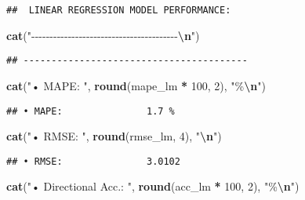 \documentclass[
]{article}
\newenvironment{Shaded}{\begin{snugshade}}{\end{snugshade}}
\newcommand{\DecValTok}[1]{\textcolor[rgb]{0.00,0.00,0.81}{#1}}
\newcommand{\FunctionTok}[1]{\textcolor[rgb]{0.13,0.29,0.53}{\textbf{#1}}}
\newcommand{\NormalTok}[1]{#1}
\newcommand{\SpecialCharTok}[1]{\textcolor[rgb]{0.81,0.36,0.00}{\textbf{#1}}}
\newcommand{\StringTok}[1]{\textcolor[rgb]{0.31,0.60,0.02}{#1}}
\begin{document}
\begin{verbatim}
##  LINEAR REGRESSION MODEL PERFORMANCE:
\end{verbatim}

\begin{Shaded}
\begin{Highlighting}[]
\FunctionTok{cat}\NormalTok{(}\StringTok{"{-}{-}{-}{-}{-}{-}{-}{-}{-}{-}{-}{-}{-}{-}{-}{-}{-}{-}{-}{-}{-}{-}{-}{-}{-}{-}{-}{-}{-}{-}{-}{-}{-}{-}{-}{-}{-}{-}{-}{-}}\SpecialCharTok{\textbackslash{}n}\StringTok{"}\NormalTok{)}
\end{Highlighting}
\end{Shaded}

\begin{verbatim}
## ----------------------------------------
\end{verbatim}

\begin{Shaded}
\begin{Highlighting}[]
\FunctionTok{cat}\NormalTok{(}\StringTok{"• MAPE:              "}\NormalTok{, }\FunctionTok{round}\NormalTok{(mape\_lm }\SpecialCharTok{*} \DecValTok{100}\NormalTok{, }\DecValTok{2}\NormalTok{), }\StringTok{"\%}\SpecialCharTok{\textbackslash{}n}\StringTok{"}\NormalTok{)}
\end{Highlighting}
\end{Shaded}

\begin{verbatim}
## • MAPE:               1.7 %
\end{verbatim}

\begin{Shaded}
\begin{Highlighting}[]
\FunctionTok{cat}\NormalTok{(}\StringTok{"• RMSE:              "}\NormalTok{, }\FunctionTok{round}\NormalTok{(rmse\_lm, }\DecValTok{4}\NormalTok{), }\StringTok{"}\SpecialCharTok{\textbackslash{}n}\StringTok{"}\NormalTok{)}
\end{Highlighting}
\end{Shaded}

\begin{verbatim}
## • RMSE:               3.0102
\end{verbatim}

\begin{Shaded}
\begin{Highlighting}[]
\FunctionTok{cat}\NormalTok{(}\StringTok{"• Directional Acc.:  "}\NormalTok{, }\FunctionTok{round}\NormalTok{(acc\_lm }\SpecialCharTok{*} \DecValTok{100}\NormalTok{, }\DecValTok{2}\NormalTok{), }\StringTok{"\%}\SpecialCharTok{\textbackslash{}n}\StringTok{"}\NormalTok{)}
\end{Highlighting}
\end{Shaded}
\end{document}
